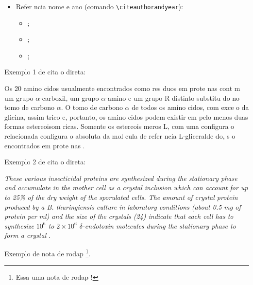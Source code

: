 \documentclass{article}
\begin{document}
\begin{itemize}
     	\begin{itemize}
     		\item \cite{Abedi2014, Agaisse1995};
             \item \cite{AgapitoTenfen2014, BtNomenclature2016, Nelson2014};
     	\end{itemize}
     	\item Refer ncia nome e ano (comando \verb|\citeauthorandyear|):
     	\begin{itemize}
     		\item {};
     		\item {};
     		\item {};
     	\end{itemize}
     \end{itemize}
     
     
     Exemplo 1 de cita o direta:
     
     \begin{citacao}
     	Os 20 amino cidos usualmente encontrados como res duos em prote nas cont m um grupo $\alpha$-carboxil, um grupo $\alpha$-amino e um grupo R distinto substitu do no  tomo de carbono $\alpha$. O  tomo de carbono $\alpha$ de todos os amino cidos, com exce o da glicina,   assim trico e, portanto, os amino cidos podem existir em pelo menos duas formas estereoisom ricas. Somente os estereois meros L, com uma configura o relacionada   configura o absoluta da mol cula de refer ncia L-gliceralde do, s o encontrados em prote nas \cite[p. 81]{Nelson2014}.
     \end{citacao}
     
     Exemplo 2 de cita o direta:
     
     \begin{citacao}
     	\textit{These various insecticidal proteins are synthesized during the stationary phase and accumulate in the mother cell as a crystal inclusion which can account for up to 25\% of the dry weight of the sporulated cells. The amount of crystal protein produced by a B. thuringiensis culture in laboratory conditions (about 0.5 mg of protein per ml) and the size of the crystals (24) indicate that each cell has to synthesize $10^6$ to $2 \times 10^6$ $\delta$-endotoxin molecules during the stationary phase to form a crystal} \cite[p. 1]{Agaisse1995}.
     \end{citacao}
     
     Exemplo de nota de rodap \footnote{Essa   uma nota de rodap !}.
     
\end{document}
